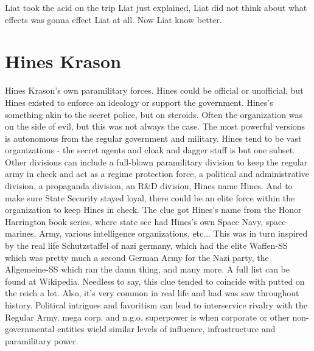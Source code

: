 \documentclass[12pt]{book}
\begin{document}
Liat took the acid on the trip Liat just explained, Liat did not think about what effects was gonna effect Liat at all. Now Liat know better.



\chapter{Hines Krason}

Hines Krason's own paramilitary forces. Hines could be official or unofficial, but Hines existed to enforce an ideology or support the government. Hines's something akin to the secret police, but on steroids. Often the organization was on the side of evil, but this was not always the case. The most powerful versions is autonomous from the regular government and military. Hines tend to be vast organizations - the secret agents and cloak and dagger stuff is but one subset. Other divisions can include a full-blown paramilitary division to keep the regular army in check and act as a regime protection force, a political and administrative division, a propaganda division, an R\&D division, Hines name Hines. And to make sure State Security stayed loyal, there could be an elite force within the organization to keep Hines in check. The clue got Hines's name from the Honor Harrington book series, where state sec had Hines's own Space Navy, space marines, Army, various intelligence organizations, etc... This was in turn inspired by the real life Schutzstaffel of nazi germany, which had the elite Waffen-SS which was pretty much a second German Army for the Nazi party, the Allgemeine-SS which ran the damn thing, and many more. A full list can be found at Wikipedia. Needless to say, this clue tended to coincide with putted on the reich a lot. Also, it's very common in real life and had was saw throughout history. Political intrigues and favoritism can lead to interservice rivalry with the Regular Army. mega corp. and n.g.o. superpower is when corporate or other non-governmental entities wield similar levels of influence, infrastructure and paramilitary power.
\end{document}
